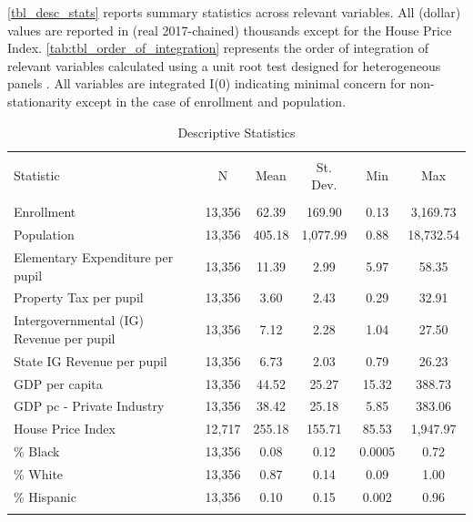\documentclass[
  10pt,
]{article}
\begin{document}
\autoref{tbl_desc_stats} reports summary statistics across relevant
variables. All (dollar) values are reported in (real 2017-chained)
thousands except for the House Price Index.
\autoref{tab:tbl_order_of_integration} represents the order of
integration of relevant variables calculated using a unit root test
designed for heterogeneous panels \autocite{im2003}. All variables are
integrated I(0) indicating minimal concern for non-stationarity except
in the case of enrollment and population.

\begin{table}[!htbp] \centering 
  \caption{Descriptive Statistics} 
  \label{tbl_desc_stats} 
\begin{tabular}{@{\extracolsep{5pt}}lccccc} 
\\[-1.8ex]\hline 
\hline \\[-1.8ex] 
Statistic & \multicolumn{1}{c}{N} & \multicolumn{1}{c}{Mean} & \multicolumn{1}{c}{St. Dev.} & \multicolumn{1}{c}{Min} & \multicolumn{1}{c}{Max} \\ 
\hline \\[-1.8ex] 
Enrollment & 13,356 & 62.39 & 169.90 & 0.13 & 3,169.73 \\ 
Population & 13,356 & 405.18 & 1,077.99 & 0.88 & 18,732.54 \\ 
Elementary Expenditure per pupil & 13,356 & 11.39 & 2.99 & 5.97 & 58.35 \\ 
Property Tax per pupil & 13,356 & 3.60 & 2.43 & 0.29 & 32.91 \\ 
Intergovernmental (IG) Revenue per pupil & 13,356 & 7.12 & 2.28 & 1.04 & 27.50 \\ 
State IG Revenue per pupil & 13,356 & 6.73 & 2.03 & 0.79 & 26.23 \\ 
GDP per capita & 13,356 & 44.52 & 25.27 & 15.32 & 388.73 \\ 
GDP pc - Private Industry & 13,356 & 38.42 & 25.18 & 5.85 & 383.06 \\ 
House Price Index & 12,717 & 255.18 & 155.71 & 85.53 & 1,947.97 \\ 
\% Black & 13,356 & 0.08 & 0.12 & 0.0005 & 0.72 \\ 
\% White & 13,356 & 0.87 & 0.14 & 0.09 & 1.00 \\ 
\% Hispanic & 13,356 & 0.10 & 0.15 & 0.002 & 0.96 \\ 
\hline \\[-1.8ex] 
\end{tabular} 
\end{table} 
\end{document}
